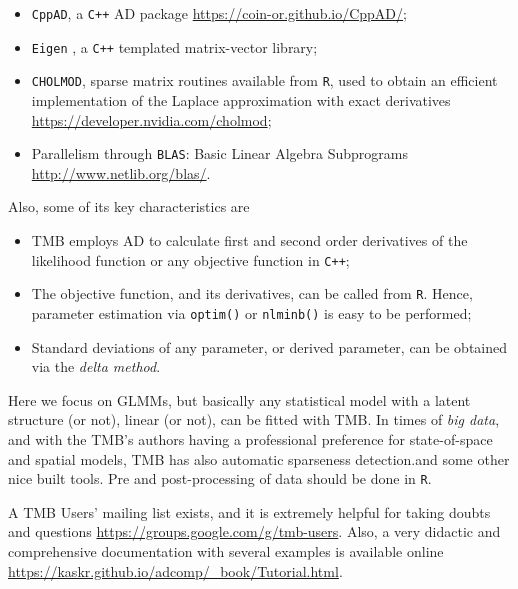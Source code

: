 \begin{itemize}
\item \texttt{CppAD}, a \texttt{C++} AD package
  \url{https://coin-or.github.io/CppAD/};
\item \texttt{Eigen} \cite{eigen}, a \texttt{C++} templated
  matrix-vector library;
\item \texttt{CHOLMOD}, sparse matrix routines available from
  \texttt{R}, used to obtain an efficient implementation of the Laplace
  approximation with exact derivatives
  \url{https://developer.nvidia.com/cholmod};
\item Parallelism through \texttt{BLAS}: Basic Linear Algebra
  Subprograms \url{http://www.netlib.org/blas/}.
\end{itemize}

Also, some of its key characteristics are

\begin{itemize}
\item TMB employs AD to calculate first and second order derivatives of
  the likelihood function or any objective function in \texttt{C++};
\item The objective function, and its derivatives, can be called from
  \texttt{R}. Hence, parameter estimation via \texttt{optim()} or
  \texttt{nlminb()} is easy to be performed;
\item Standard deviations of any parameter, or derived parameter, can be
  obtained via the \textit{delta method}.
\end{itemize}

Here we focus on GLMMs, but basically any statistical model with a
latent structure (or not), linear (or not), can be fitted with TMB. In
times of \textit{big data}, and with the TMB's authors having a
professional preference for state-of-space and spatial models, TMB has
also automatic sparseness detection.and some other nice built tools. Pre
and post-processing of data should be done in \texttt{R}.

A TMB Users' mailing list exists, and it is extremely helpful for taking
doubts and questions \url{https://groups.google.com/g/tmb-users}. Also,
a very didactic and comprehensive documentation with several examples is
available online
\url{https://kaskr.github.io/adcomp/_book/Tutorial.html}.

